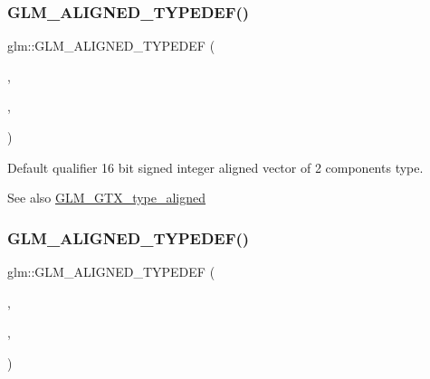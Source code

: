 \subsubsection{\texorpdfstring{G\+L\+M\+\_\+\+A\+L\+I\+G\+N\+E\+D\+\_\+\+T\+Y\+P\+E\+D\+E\+F()}{GLM\_ALIGNED\_TYPEDEF()}\hspace{0.1cm}{\footnotesize\ttfamily [58/209]}}
{\footnotesize\ttfamily glm\+::\+G\+L\+M\+\_\+\+A\+L\+I\+G\+N\+E\+D\+\_\+\+T\+Y\+P\+E\+D\+EF (\begin{DoxyParamCaption}\item[{\hyperlink{group__gtc__type__precision_gad912fd04abb876a5b806118ec6e0f283}{i16vec2}}]{,  }\item[{aligned\+\_\+i16vec2}]{,  }\item[{4}]{ }\end{DoxyParamCaption})}

Default qualifier 16 bit signed integer aligned vector of 2 components type. \begin{DoxySeeAlso}{See also}
\hyperlink{group__gtx__type__aligned}{G\+L\+M\+\_\+\+G\+T\+X\+\_\+type\+\_\+aligned} 
\end{DoxySeeAlso}
\mbox{\label{group__gtx__type__aligned_gaaee91dd2ab34423bcc11072ef6bd0f02}} 
\subsubsection{\texorpdfstring{G\+L\+M\+\_\+\+A\+L\+I\+G\+N\+E\+D\+\_\+\+T\+Y\+P\+E\+D\+E\+F()}{GLM\_ALIGNED\_TYPEDEF()}\hspace{0.1cm}{\footnotesize\ttfamily [59/209]}}
{\footnotesize\ttfamily glm\+::\+G\+L\+M\+\_\+\+A\+L\+I\+G\+N\+E\+D\+\_\+\+T\+Y\+P\+E\+D\+EF (\begin{DoxyParamCaption}\item[{\hyperlink{group__gtc__type__precision_ga1f2b1dd6e4d9109be5f4433c8ff38cb8}{i16vec3}}]{,  }\item[{aligned\+\_\+i16vec3}]{,  }\item[{8}]{ }\end{DoxyParamCaption})}

